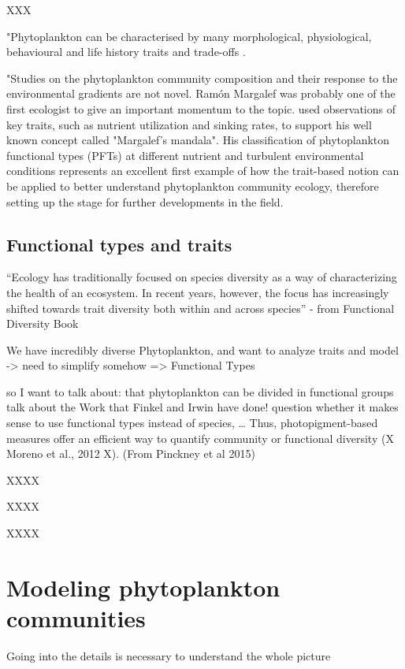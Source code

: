 XXX

"Phytoplankton can be characterised by many morphological, physiological, behavioural and life history traits and trade-offs \citep{Litchman2008, Litchman2010}.

"Studies on the phytoplankton community composition and their response to the environmental gradients are not novel. Ramón Margalef was probably one of the first ecologist to give an important momentum to the topic.  \citep{Margalef1978} used observations of key traits, such as nutrient utilization and sinking rates, to support his well known concept called "Margalef's mandala". His classification of phytoplankton functional types (PFTs) at different nutrient and turbulent environmental conditions represents an excellent first example of how the trait-based notion can be applied to better understand phytoplankton community ecology, therefore setting up the stage for further developments in the field.


\subsection{Functional types and traits}

“Ecology has traditionally focused on species diversity as a way of characterizing the
health of an ecosystem. In recent years, however, the focus has increasingly shifted
towards trait diversity both within and across species” - from Functional Diversity Book

We have incredibly diverse Phytoplankton, and want to analyze traits and model -> need to simplify somehow => Functional Types

so I want to talk about:
that phytoplankton can be divided in functional groups
talk about the Work that Finkel and Irwin have done! 
question whether it makes sense to use functional types instead of species, …
Thus, photopigment-based measures offer an efficient way to quantify community or functional diversity (X Moreno et al., 2012 X). (From Pinckney et al 2015)



XXXX


XXXX


XXXX


\section{Modeling phytoplankton communities}
Going into the details is necessary to understand the whole picture


